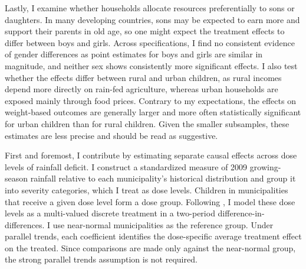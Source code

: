 Lastly, I examine whether households allocate resources preferentially to sons or daughters. In many developing countries, sons may be expected to earn more and support their parents in old age, so one might expect the treatment effects to differ between boys and girls. Across specifications, I find no consistent evidence of gender differences as point estimates for boys and girls are similar in magnitude, and neither sex shows consistently more significant effects. I also test whether the effects differ between rural and urban children, as rural incomes depend more directly on rain-fed agriculture, whereas urban households are exposed mainly through food prices. Contrary to my expectations, the effects on weight-based outcomes are generally larger and more often statistically significant for urban children than for rural children. Given the smaller subsamples, these estimates are less precise and should be read as suggestive.

First and foremost, I contribute by estimating separate causal effects across dose levels of rainfall deficit. I construct a standardized measure of 2009 growing-season rainfall relative to each municipality's historical distribution and group it into severity categories, which I treat as dose levels. Children in municipalities that receive a given dose level form a dose group. Following \textcite{callawayDifferenceinDifferencesContinuousTreatment2024}, I model these dose levels as a multi-valued discrete treatment in a two-period difference-in-differences. I use near-normal municipalities as the reference group. Under parallel trends, each coefficient identifies the dose-specific average treatment effect on the treated. Since comparisons are made only against the near-normal group, the strong parallel trends assumption is not required.

